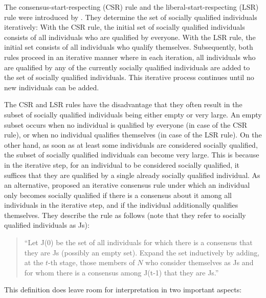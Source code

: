 \documentclass[
    12pt,               %
    a4paper,            %
    bibtotoc,           %
    pointlessnumbers,   %
    ngerman,            %
    titlepage,          %
    leqno,              %
    ]{scrarticle}       %
\begin{document}
The consensus-start-respecting (CSR) rule and the liberal-start-respecting (LSR) rule were introduced by \textcite{DSX07}. They determine the set of socially qualified individuals iteratively: With the CSR rule, the initial set of socially qualified individuals consists of all individuals who are qualified by everyone. With the LSR rule, the initial set consists of all individuals who qualify themselves. Subsequently, both rules proceed in an iterative manner where in each iteration, all individuals who are qualified by any of the currently socially qualified individuals are added to the set of socially qualified individuals. This iterative process continues until no new individuals can be added.

The CSR and LSR rules have the disadvantage that they often result in the subset of socially qualified individuals being either empty or very large. An empty subset occurs when no individual is qualified by everyone (in case of the CSR rule), or when no individual qualifies themselves (in case of the LSR rule). On the other hand, as soon as at least some individuals are considered socially qualified, the subset of socially qualified individuals can become very large. This is because in the iterative step, for an individual to be considered socially qualified, it suffices that they are qualified by a single already socially qualified individual. As an alternative, \textcite{KR97} proposed an iterative consensus rule under which an individual only becomes socially qualified if there is a consensus about it among all individuals in the iterative step, and if the individual additionally qualifies themselves. They describe the rule as follows (note that they refer to socially qualified individuals as Js):

\begin{quote}
``Let J(0) be the set of all individuals for which there is a consensus that they are Js (possibly an empty set). Expand the set inductively by adding, at the $t$-th stage, those members of $N$ who consider themselves as Js and for whom there is a consensus among J(t-1) that they are Js.'' \cite{KR97}
\end{quote}

This definition does leave room for interpretation in two important aspects:
\end{document}
